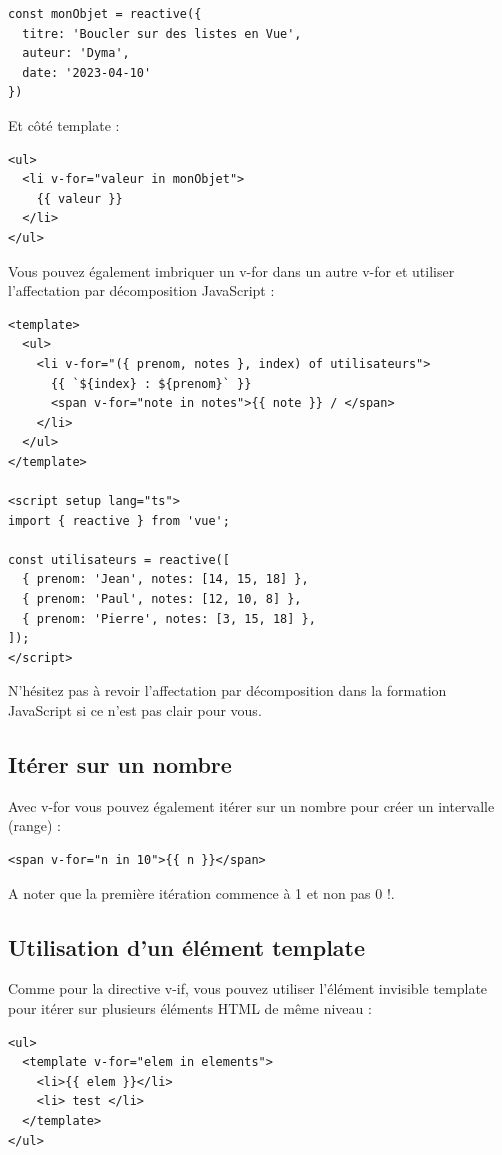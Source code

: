 \documentclass{article}
\begin{document}
\begin{verbatim}
const monObjet = reactive({
  titre: 'Boucler sur des listes en Vue',
  auteur: 'Dyma',
  date: '2023-04-10'
})
\end{verbatim}
Et côté template :
\begin{verbatim}
<ul>
  <li v-for="valeur in monObjet">
    {{ valeur }}
  </li>
</ul>
\end{verbatim}
Vous pouvez également imbriquer un {\color{monOrange}v-for} dans un autre {\color{monOrange}v-for} et utiliser l'affectation par décomposition JavaScript :
\begin{verbatim}
<template>
  <ul>
    <li v-for="({ prenom, notes }, index) of utilisateurs">
      {{ `${index} : ${prenom}` }}
      <span v-for="note in notes">{{ note }} / </span>
    </li>
  </ul>
</template>

<script setup lang="ts">
import { reactive } from 'vue';

const utilisateurs = reactive([
  { prenom: 'Jean', notes: [14, 15, 18] },
  { prenom: 'Paul', notes: [12, 10, 8] },
  { prenom: 'Pierre', notes: [3, 15, 18] },
]);
</script>
\end{verbatim}
N'hésitez pas à revoir l'affectation par décomposition dans la formation JavaScript si ce n'est pas clair pour vous.

\subsection{Itérer sur un nombre}
Avec {\color{monOrange}v-for} vous pouvez également itérer sur un nombre pour créer un intervalle ({\color{monOrange}range}) :
\begin{verbatim}
<span v-for="n in 10">{{ n }}</span>
\end{verbatim}
A noter que la première itération commence à 1 et non pas 0 !.

\subsection{Utilisation d'un élément template}
Comme pour la directive {\color{monOrange}v-if}, vous pouvez utiliser l'élément invisible {\color{monOrange}template} pour itérer sur plusieurs éléments HTML de même niveau :
\begin{verbatim}
<ul>
  <template v-for="elem in elements">
    <li>{{ elem }}</li>
    <li> test </li>
  </template>
</ul>
\end{verbatim}
\end{document}
